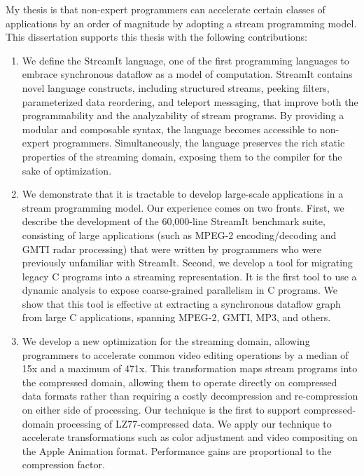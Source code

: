 \label{chap:conclusions}

My thesis is that non-expert programmers can accelerate certain
classes of applications by an order of magnitude by adopting a stream
programming model.  This dissertation supports this thesis with the
following contributions:

\begin{enumerate}

\item We define the StreamIt language, one of the first programming 
languages to embrace synchronous dataflow as a model of computation.
StreamIt contains novel language constructs, including structured
streams, peeking filters, parameterized data reordering, and teleport
messaging, that improve both the programmability and the analyzability
of stream programs.  By providing a modular and composable syntax, the
language becomes accessible to non-expert programmers.  Simultaneously,
the language preserves the rich static properties of the streaming
domain, exposing them to the compiler for the sake of optimization.

\item We demonstrate that it is tractable to develop large-scale 
applications in a stream programming model.  Our experience comes on
two fronts.  First, we describe the development of the 60,000-line
StreamIt benchmark suite, consisting of large applications (such as
MPEG-2 encoding/decoding and GMTI radar processing) that were written
by programmers who were previously unfamiliar with StreamIt.  Second,
we develop a tool for migrating legacy C programs into a streaming
representation.  It is the first tool to use a dynamic analysis to
expose coarse-grained parallelism in C programs.  We show that this
tool is effective at extracting a synchronous dataflow graph from
large C applications, spanning MPEG-2, GMTI, MP3, and others.

\item We develop a new optimization for the streaming domain, allowing 
programmers to accelerate common video editing operations by a median
of 15x and a maximum of 471x.  This transformation maps stream
programs into the compressed domain, allowing them to operate directly
on compressed data formats rather than requiring a costly
decompression and re-compression on either side of processing.  Our
technique is the first to support compressed-domain processing of
LZ77-compressed data.  We apply our technique to accelerate
transformations such as color adjustment and video compositing on the
Apple Animation format.  Performance gains are proportional to the
compression factor.


\end{enumerate}
